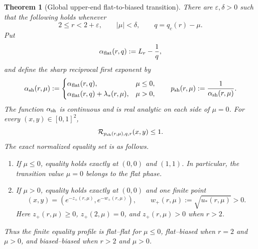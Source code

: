 \documentclass[11pt,reqno]{amsart}
\numberwithin{equation}{section}
\newtheorem{theorem}{Theorem}[section]
\theoremstyle{definition}
\theoremstyle{remark}
\begin{document}
\begin{theorem}[Global upper-end flat-to-biased transition]
\label{thm:upper-global-transition}
There are $\varepsilon,\delta>0$ such that the following holds whenever
\[
  2\le r<2+\varepsilon,\qquad |\mu|<\delta,\qquad
  q=q_c(r)-\mu.
\]
Put
\[
  \alpha_{\rm flat}(r,q):=L_r-\frac1q,
\]
and define the sharp reciprocal first exponent by
\begin{equation}\label{eq:alpha-sh-piecewise}
  \alpha_{\rm sh}(r,\mu):=
  \begin{cases}
    \alpha_{\rm flat}(r,q),&\mu\le0,\\
    \alpha_{\rm flat}(r,q)+\lambda_*(r,\mu),&\mu>0,
  \end{cases}
  \qquad
  p_{\rm sh}(r,\mu):=\frac1{\alpha_{\rm sh}(r,\mu)}.
\end{equation}
The function $\alpha_{\rm sh}$ is continuous and is real analytic on each side
of $\mu=0$.  For every $(x,y)\in[0,1]^2$,
\begin{equation}\label{eq:upper-global-ratio}
  \mathcal R_{p_{\rm sh}(r,\mu),q,r}(x,y)\le1.
\end{equation}
The exact normalized equality set is as follows.
\begin{enumerate}[label=\textup{(\roman*)}]
  \item If $\mu\le0$, equality holds exactly at $(0,0)$ and $(1,1)$.
  In particular, the transition value $\mu=0$ belongs to the flat phase.
  \item If $\mu>0$, equality holds exactly at $(0,0)$ and one finite point
  \begin{equation}\label{eq:upper-biased-point}
    (x,y)=\left(e^{-z_+(r,\mu)},e^{-w_+(r,\mu)}\right),
    \qquad
    w_+(r,\mu):=\sqrt{u_*(r,\mu)}>0.
  \end{equation}
  Here $z_+(r,\mu)\ge0$,
  $z_+(2,\mu)=0$, and $z_+(r,\mu)>0$ when $r>2$.
\end{enumerate}
Thus the finite equality profile is flat--flat for $\mu\le0$, flat--biased
when $r=2$ and $\mu>0$, and biased--biased when $r>2$ and $\mu>0$.
\end{theorem}
\end{document}
